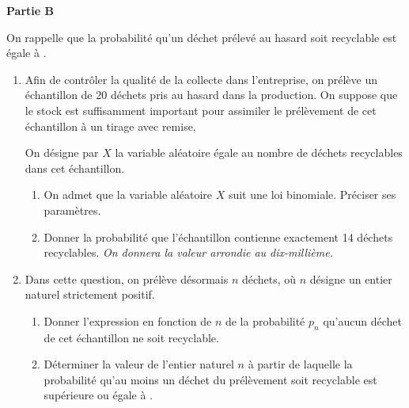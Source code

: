 \medskip

\textbf{Partie B}

\medskip

On rappelle que la probabilité qu'un déchet prélevé au hasard soit recyclable est égale à .

\begin{enumerate}
\item Afin de contrôler la qualité de la collecte dans l'entreprise, on prélève un échantillon de 20 déchets pris au hasard dans la production. On suppose que le stock est suffisamment important pour assimiler le prélèvement de cet échantillon à un tirage avec remise.

On désigne par $X$ la variable aléatoire égale au nombre de déchets recyclables dans cet échantillon.

	\begin{enumerate}
		\item On admet que la variable aléatoire $X$ suit une loi binomiale. Préciser ses paramètres.

		\item Donner la probabilité que l'échantillon contienne exactement 14 déchets recyclables. \emph{On donnera la valeur arrondie au dix-millième.}
	\end{enumerate}

\item Dans cette question, on prélève désormais $n$ déchets, où $n$ désigne un entier naturel strictement positif.

	\begin{enumerate}
		\item Donner l'expression en fonction de $n$ de la probabilité $p_{n}$ qu'aucun déchet de cet échantillon ne soit recyclable.
		\item Déterminer la valeur de l'entier naturel $n$ à partir de laquelle la probabilité qu'au moins un déchet du prélèvement soit recyclable est supérieure ou égale à .
	\end{enumerate}
\end{enumerate}

\bigskip
